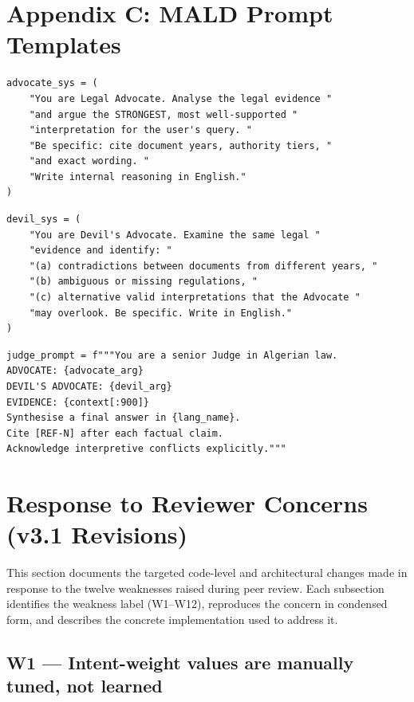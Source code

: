 \documentclass[12pt,a4paper]{article}
\begin{document}
\section{Appendix C: MALD Prompt Templates}

\begin{lstlisting}[style=pythonstyle,caption={Advocate system prompt.}]
advocate_sys = (
    "You are Legal Advocate. Analyse the legal evidence "
    "and argue the STRONGEST, most well-supported "
    "interpretation for the user's query. "
    "Be specific: cite document years, authority tiers, "
    "and exact wording. "
    "Write internal reasoning in English."
)
\end{lstlisting}

\begin{lstlisting}[style=pythonstyle,caption={Devil's Advocate system prompt.}]
devil_sys = (
    "You are Devil's Advocate. Examine the same legal "
    "evidence and identify: "
    "(a) contradictions between documents from different years, "
    "(b) ambiguous or missing regulations, "
    "(c) alternative valid interpretations that the Advocate "
    "may overlook. Be specific. Write in English."
)
\end{lstlisting}

\begin{lstlisting}[style=pythonstyle,caption={Judge system prompt (simplified).}]
judge_prompt = f"""You are a senior Judge in Algerian law.
ADVOCATE: {advocate_arg}
DEVIL'S ADVOCATE: {devil_arg}
EVIDENCE: {context[:900]}
Synthesise a final answer in {lang_name}.
Cite [REF-N] after each factual claim.
Acknowledge interpretive conflicts explicitly."""
\end{lstlisting}

\section{Response to Reviewer Concerns (v3.1 Revisions)}
\label{sec:reviewer-response}

This section documents the targeted code-level and architectural changes made
in response to the twelve weaknesses raised during peer review. Each subsection
identifies the weakness label (W1–W12), reproduces the concern in condensed
form, and describes the concrete implementation used to address it.

\subsection{W1 — Intent-weight values are manually tuned, not learned}
\end{document}

